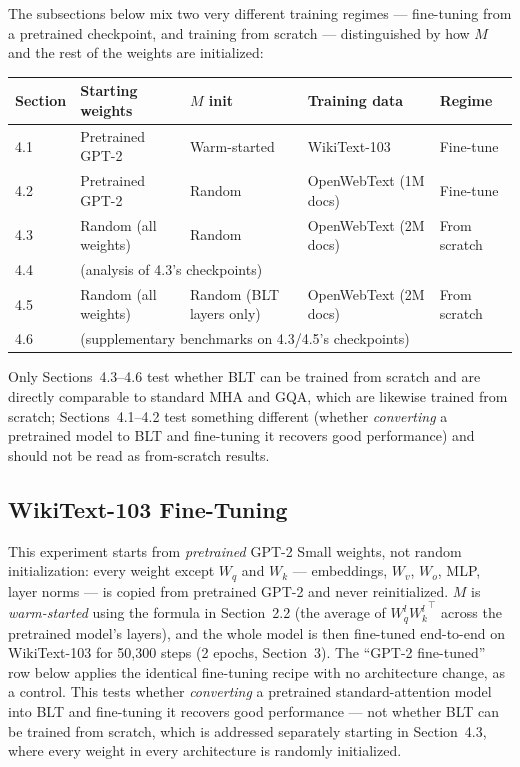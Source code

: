 \documentclass[11pt]{article}
\begin{document}
The subsections below mix two very different training regimes --- fine-tuning from a pretrained checkpoint, and training from scratch --- distinguished by how $M$ and the rest of the weights are initialized:

\begin{center}
\begin{tabular}{lllll}
\toprule
Section & Starting weights & $M$ init & Training data & Regime \\
\midrule
4.1 & Pretrained GPT-2 & Warm-started & WikiText-103 & Fine-tune \\
4.2 & Pretrained GPT-2 & Random & OpenWebText (1M docs) & Fine-tune \\
4.3 & Random (all weights) & Random & OpenWebText (2M docs) & From scratch \\
4.4 & \multicolumn{4}{l}{(analysis of 4.3's checkpoints)} \\
4.5 & Random (all weights) & Random (BLT layers only) & OpenWebText (2M docs) & From scratch \\
4.6 & \multicolumn{4}{l}{(supplementary benchmarks on 4.3/4.5's checkpoints)} \\
\bottomrule
\end{tabular}
\end{center}

Only Sections~4.3--4.6 test whether BLT can be trained from scratch and are directly comparable to standard MHA and GQA, which are likewise trained from scratch; Sections~4.1--4.2 test something different (whether \emph{converting} a pretrained model to BLT and fine-tuning it recovers good performance) and should not be read as from-scratch results.

\subsection{WikiText-103 Fine-Tuning}

This experiment starts from \emph{pretrained} GPT-2 Small weights, not random initialization: every weight except $W_q$ and $W_k$ --- embeddings, $W_v$, $W_o$, MLP, layer norms --- is copied from pretrained GPT-2 and never reinitialized. $M$ is \emph{warm-started} using the formula in Section~2.2 (the average of $W_q^l {W_k^l}^\top$ across the pretrained model's layers), and the whole model is then fine-tuned end-to-end on WikiText-103 for 50{,}300 steps (2 epochs, Section~3). The ``GPT-2 fine-tuned'' row below applies the identical fine-tuning recipe with no architecture change, as a control. This tests whether \emph{converting} a pretrained standard-attention model into BLT and fine-tuning it recovers good performance --- not whether BLT can be trained from scratch, which is addressed separately starting in Section~4.3, where every weight in every architecture is randomly initialized.
\end{document}
